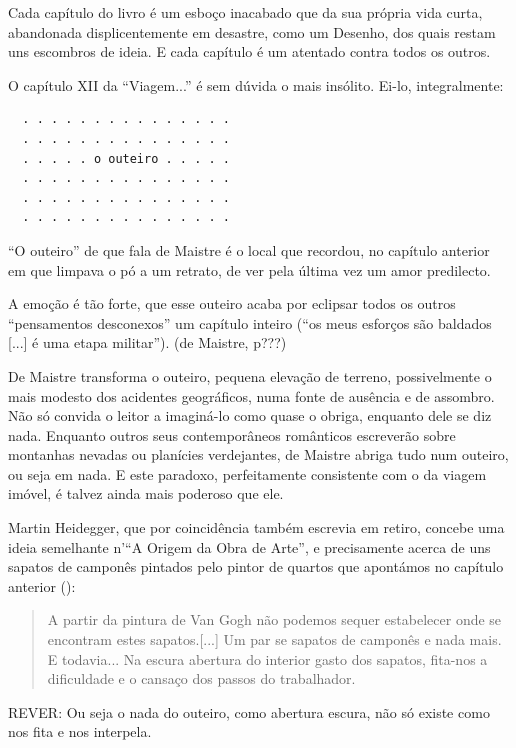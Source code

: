 \documentclass[12pt]{article}
\begin{document}
Cada capítulo do livro é um esboço inacabado que da sua própria vida
curta, abandonada displicentemente em desastre, como um Desenho, dos
quais restam uns escombros de ideia. E cada capítulo é um atentado
contra todos os outros.

O capítulo XII da ``Viagem...'' é sem dúvida o mais insólito. Ei-lo,
integralmente:

\begin{verbatim}
  . . . . . . . . . . . . . . .
  . . . . . . . . . . . . . . .
  . . . . . o outeiro . . . . .
  . . . . . . . . . . . . . . .
  . . . . . . . . . . . . . . .
  . . . . . . . . . . . . . . .
\end{verbatim}

``O outeiro'' de que fala de Maistre é o local que recordou, no
capítulo anterior em que limpava o pó a um retrato, de ver pela última
vez um amor predilecto.

A emoção é tão forte, que esse outeiro acaba por eclipsar todos os
outros ``pensamentos desconexos'' um capítulo inteiro (``os meus
esforços são baldados [...] é uma etapa militar''). (de Maistre, p???)

De Maistre transforma o outeiro, pequena elevação de terreno,
possivelmente o mais modesto dos acidentes geográficos, numa fonte de
ausência e de assombro. Não só convida o leitor a imaginá-lo como
quase o obriga, enquanto dele se diz nada. Enquanto outros seus
contemporâneos românticos escreverão sobre montanhas nevadas ou
planícies verdejantes, de Maistre abriga tudo num outeiro, ou seja em
nada. E este paradoxo, perfeitamente consistente com o da viagem
imóvel, é talvez ainda mais poderoso que ele.

Martin Heidegger, que por coincidência também escrevia em retiro,
concebe uma ideia semelhante n'``A Origem da Obra de Arte'', e
precisamente acerca de uns sapatos de camponês pintados pelo pintor de
quartos que apontámos no capítulo anterior (\cite[p.24]{heidegger}):

\begin{quote}
  A partir da pintura de Van Gogh não podemos sequer estabelecer onde
  se encontram estes sapatos.[...] Um par se sapatos de camponês e
  nada mais. E todavia...  Na escura abertura do interior gasto dos
  sapatos, fita-nos a dificuldade e o cansaço dos passos do
  trabalhador.
\end{quote} 

REVER: Ou seja o nada do outeiro, como abertura escura, não só existe como
nos fita e nos interpela.
\end{document}
